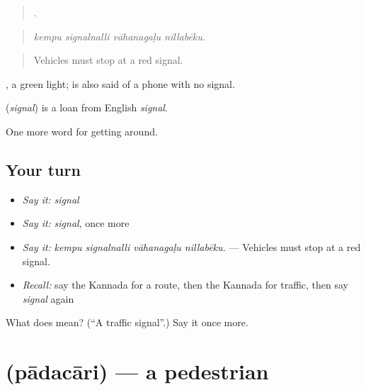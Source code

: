 \begin{quote}
   .
\end{quote}

\begin{quote}
\emph{kempu signalnalli vāhanagaḷu nillabēku.}
\end{quote}

\begin{quote}
Vehicles must stop at a red signal.
\end{quote}

 , a green light;   is also said of a phone with no signal.

\begin{cousinweb}
\textbf{} (\emph{signal}) is a loan from English \emph{signal}.
\end{cousinweb}

\begin{grammarlens}[title={What you've built}]
One more word for getting around.
\end{grammarlens}

\subsection*{Your turn}
\begin{itemize}
\raggedright
  \item \emph{Say it:} \emph{signal}
  \item \emph{Say it:} \emph{signal}, once more
  \item \emph{Say it:} \emph{kempu signalnalli vāhanagaḷu nillabēku.} — Vehicles must stop at a red signal.
  \item \emph{Recall:} say the Kannada for a route, then the Kannada for traffic, then say \emph{signal} again
\end{itemize}

\begin{tcolorbox}[breakable,colback=teal!4,colframe=teal!35!black,title={Before you move on}]
What does  mean? (\textquotedblleft{}A traffic signal\textquotedblright{}.) Say it once more.
\end{tcolorbox}
\section[\texorpdfstring{\kn{ಪಾದಚಾರಿ} (pādacāri)}{ಪಾದಚಾರಿ (pādacāri)}]{ (pādacāri) — a pedestrian}

